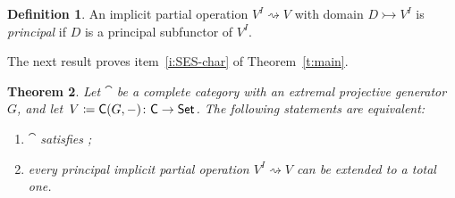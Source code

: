 \documentclass[a4paper,10pt,reqno]{amsart}
\newtheorem{theorem}{Theorem}[section]
\theoremstyle{definition}
\newtheorem{definition}[theorem]{Definition}
\theoremstyle{remark}
\begin{document}
\begin{definition}
An implicit partial operation $V^{I} \rightsquigarrow V$ with domain $D\rightarrowtail V^{I}$ is \emph{principal} if $D$ is a principal subfunctor of $V^I$.
\end{definition}

The next result proves item~\ref{i:SES-char} of Theorem~\ref{t:main}.

\begin{theorem}\label{t:SES-vs-implicit-product-pres-operations}
Let $\cat$ be a complete category with an extremal projective generator~$G$, and let~$V\coloneqq{\sf C}(G,-)\colon{\sf C}\to{\sf Set}$.  The following statements are equivalent:
%
\begin{enumerate}[label=(\arabic*),series=implicitops-SES]
\item\label{i:Cat-satisfies-SES} $\cat$ satisfies \SES;
\item\label{i:prod-pres-admits-extension} every principal implicit partial operation $V^{I} \rightsquigarrow V$ can be extended to a total one.
\end{enumerate}
\end{theorem}
\end{document}

